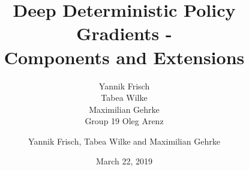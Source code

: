 \documentclass[accentcolor=tud1d,colorbacktitle,inverttitle,landscape,german,presentation,t]{tudbeamer}
\begin{document}
	
	\title[DDPG]{Deep Deterministic Policy Gradients -\\ Components and Extensions}
	\subtitle{Yannik Frisch\\Tabea Wilke\\Maximilian Gehrke \\Group 19 Oleg Arenz}
	
	\author[Yannik Frisch et al.]{Yannik Frisch, Tabea Wilke and Maximilian Gehrke}


	
	\date{March 22, 2019}
	

\begin{titleframe}
\end{titleframe}
\end{document}
